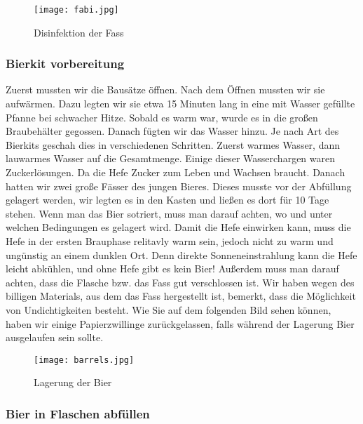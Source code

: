 \begin{figure}[!h]
	\centering
	\texttt{[image: fabi.jpg]}
	\caption{Disinfektion der Fass}
\end{figure}


\subsubsection{Bierkit vorbereitung}
Zuerst mussten wir die Bausätze öffnen. Nach dem Öffnen mussten wir sie aufwärmen. Dazu legten wir
sie etwa 15 Minuten lang in eine mit Wasser gefüllte Pfanne bei schwacher Hitze. Sobald es warm war,
wurde es in die großen Braubehälter gegossen. Danach fügten wir das Wasser hinzu. Je nach Art des Bierkits
geschah dies in verschiedenen Schritten. Zuerst warmes Wasser, dann lauwarmes Wasser auf die Gesamtmenge.
Einige dieser Wasserchargen waren Zuckerlösungen. Da die Hefe Zucker zum Leben und Wachsen braucht.
Danach hatten wir zwei große Fässer des jungen Bieres.
Dieses musste vor der Abfüllung gelagert werden, wir legten es in den Kasten und ließen es dort für 10 Tage stehen.
Wenn man das Bier sotriert, muss man darauf achten, wo und unter welchen Bedingungen es gelagert wird.
Damit die Hefe einwirken kann, muss die Hefe in der ersten Brauphase relitavly warm sein, jedoch nicht zu warm und ungünstig an einem dunklen Ort. 
Denn direkte Sonneneinstrahlung kann die Hefe leicht abkühlen, und ohne Hefe gibt es kein Bier!
Außerdem muss man darauf achten, dass die Flasche bzw. das Fass gut verschlossen ist. Wir haben wegen des billigen Materials,
aus dem das Fass hergestellt ist, bemerkt, dass die Möglichkeit von Undichtigkeiten besteht. Wie Sie auf dem folgenden Bild sehen können,
haben wir einige Papierzwillinge zurückgelassen, falls während der Lagerung Bier ausgelaufen sein sollte. \\



\begin{figure}[!h]
	\centering
	\texttt{[image: barrels.jpg]}
	\caption{Lagerung der Bier}
\end{figure}
\newpage

\subsubsection{Bier in Flaschen abfüllen}